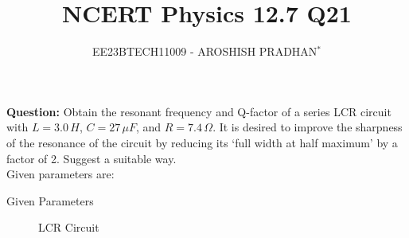 \documentclass[journal,12pt,twocolumn]{IEEEtran}
\theoremstyle{remark}
\begin{document}

\vspace{3cm}

\title{NCERT Physics 12.7 Q21}
\author{EE23BTECH11009 - AROSHISH PRADHAN$^{*}$%
}
\maketitle
\newpage
\bigskip
\textbf{Question:} 
Obtain the resonant frequency and Q-factor of a series LCR circuit with $L = 3.0\, H$, $C = 27\, \mu F$, and $R = 7.4\, \Omega$. It is desired to improve the sharpness of the resonance of the circuit by reducing its `full width at half maximum' by a factor of 2. Suggest a suitable way.\\

\solution
Given parameters are:
\begin{table}[!h]
    \centering
    \resizebox{\columnwidth}{!}{
    }
    \vspace{6 pt}
    \caption{Given Parameters}
    \label{tab:1}
\end{table}
\begin{figure}[!h]
 \centering
    
    \caption{LCR Circuit}
    \label{fig:enter-label}
\end{figure}
\end{document}
